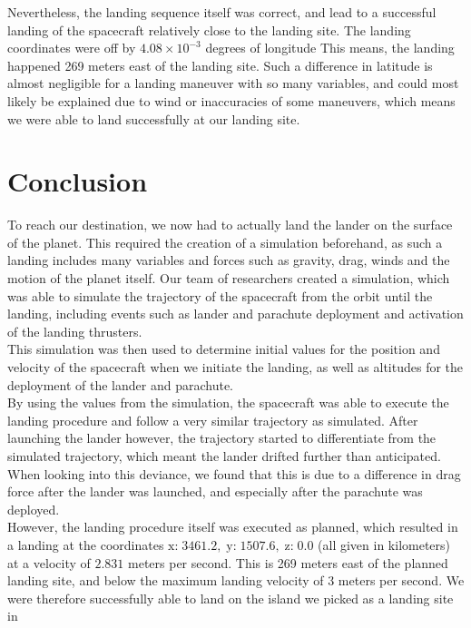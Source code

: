 \documentclass[reprint,english,notitlepage]{revtex4-2}
\begin{document}
Nevertheless, the landing sequence itself was correct, and lead to a successful landing of the spacecraft relatively close to the landing site.
The landing coordinates were off by $4.08 \times 10^{-3}$ degrees of longitude
This means, the landing happened 269 meters east of the landing site.
Such a difference in latitude is almost negligible for a landing maneuver with so many variables, and could most likely be explained due to wind or inaccuracies of some maneuvers, which means we were able to land successfully at our landing site.


\section{Conclusion} \label{sec:conclusion}
To reach our destination, we now had to actually land the lander on the surface of the planet.
This required the creation of a simulation beforehand, as such a landing includes many variables and forces such as gravity, drag, winds and the motion of the planet itself.
Our team of researchers created a simulation, which was able to simulate the trajectory of the spacecraft from the orbit until the landing, including events such as lander and parachute deployment and activation of the landing thrusters.\\

This simulation was then used to determine initial values for the position and velocity of the spacecraft when we initiate the landing, as well as altitudes for the deployment of the lander and parachute.\\

By using the values from the simulation, the spacecraft was able to execute the landing procedure and follow a very similar trajectory as simulated.
After launching the lander however, the trajectory started to differentiate from the simulated trajectory, which meant the lander drifted further than anticipated.
When looking into this deviance, we found that this is due to a difference in drag force after the lander was launched, and especially after the parachute was deployed.\\

However, the landing procedure itself was executed as planned, which resulted in a landing at the coordinates $\text{x:} \;3461.2, \;\text{y:} \;1507.6, \;\text{z:} \;0.0$ (all given in kilometers) at a velocity of $2.831$ meters per second.
This is 269 meters east of the planned landing site, and below the maximum landing velocity of 3 meters per second.
We were therefore successfully able to land on the island we picked as a landing site in%
\end{document}
